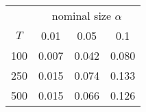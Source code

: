 % 
\begin{tabular}{cccc}
  \hline
  & \multicolumn{3}{c}{nominal size $\alpha$} \\
 $T$ & 0.01 & 0.05 & 0.1 \\
 \hline
100 & 0.007 & 0.042 & 0.080 \\ 
  250 & 0.015 & 0.074 & 0.133 \\ 
  500 & 0.015 & 0.066 & 0.126 \\ 
   \hline
\end{tabular}

